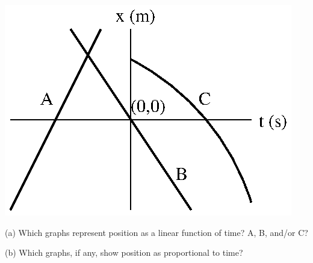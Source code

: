 \vspace{0.3cm}
{\par\centering \includegraphics{measuring/measuring_fig3.eps} \par}
\vspace{0.3cm}

(a) Which graphs represent position as a linear function of time? A, B, and/or
C?
\answerspace{10mm}

(b) Which graphs, if any, show position as proportional to time?
\answerspace{10mm}
